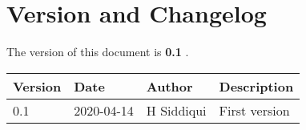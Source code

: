 \section{Version and Changelog}

The version of this document is {\bf 0.1} .

\begin{table}[H]
    \begin{tabular}{|l|l|l|p{10cm}| }
    \hline
    {\bf Version} & {\bf Date} & {\bf Author} & {\bf Description} \\ \hline
    0.1 & 2020-04-14 & H Siddiqui & First version \\ \hline
    \end{tabular}
\end{table}

